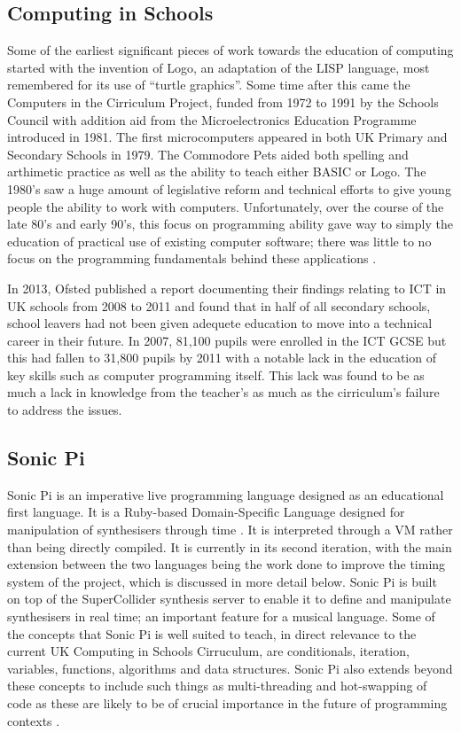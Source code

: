 \documentclass[11pt]{scrartcl}
\begin{document}
\subsection{Computing in Schools}
Some of the earliest significant pieces of work towards the 
education of computing started with the invention of Logo, an adaptation of 
the LISP language, most remembered for its use of ``turtle graphics''. Some 
time after this came the Computers in the Cirriculum Project, funded from 
1972 to 1991 by the Schools Council with addition aid from the Microelectronics 
Education Programme introduced in 1981. The first microcomputers appeared in 
both UK Primary and Secondary Schools in 1979. The Commodore Pets aided both 
spelling and arthimetic practice as well as the ability to teach either BASIC or 
Logo. The 1980's saw a huge amount of legislative reform and technical efforts 
to give young people the ability to work with computers. Unfortunately, over the 
course of the late 80's and early 90's, this focus on programming ability gave 
way to simply the education of practical use of existing computer software; 
there was little to no focus on the programming fundamentals behind 
these applications \cite{naec}.

In 2013, Ofsted published a report documenting their findings relating to ICT 
in UK schools from 2008 to 2011 and found that in half of all secondary 
schools, school leavers had not been given adequete education to move into a 
technical career in their future. In 2007, 81,100 pupils were enrolled in the 
ICT GCSE but this had fallen to 31,800 pupils by 2011 \cite{DfEO13} with a 
notable lack in the education of key skills such as computer programming 
itself. This lack was found to be as much a lack in knowledge from the 
teacher's as much as the cirriculum's failure to address the issues.

\subsection{Sonic Pi}
Sonic Pi is an imperative live programming language designed as an educational 
first language. It is a Ruby-based Domain-Specific Language designed for 
manipulation of synthesisers through time \cite{AB13}. It is interpreted through 
a VM rather than being directly compiled. It is currently in its 
second iteration, with the main extension between the two languages being the 
work done to improve the timing system of the project, which is discussed in 
more detail below. Sonic Pi is built on top of the SuperCollider synthesis 
server to enable it to define and manipulate synthesisers in real time; an 
important feature for a musical language. Some of the concepts that Sonic Pi 
is well suited to teach, in direct relevance to the current UK Computing in 
Schools Cirruculum, are conditionals, iteration, variables, functions, 
algorithms and data structures. Sonic Pi also extends beyond these concepts to 
include such things as multi-threading and hot-swapping of code as these are 
likely to be of crucial importance in the future of programming contexts \cite{
AOB14}.
\end{document}
